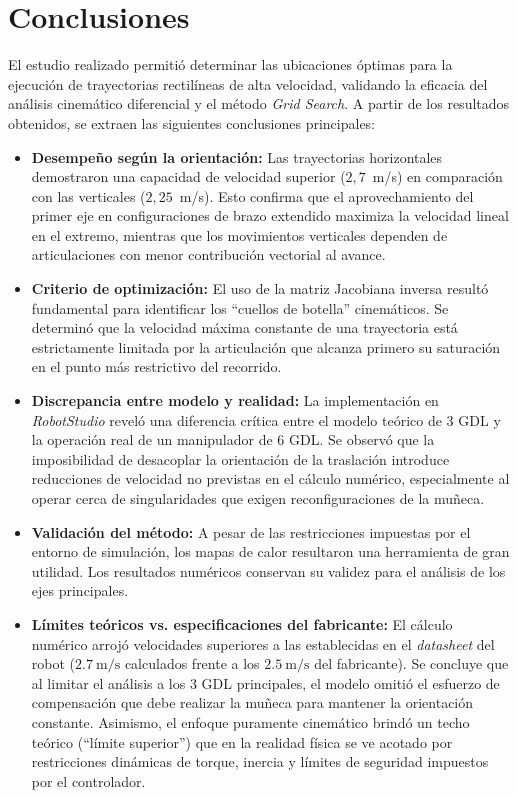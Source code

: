 \section{Conclusiones}

El estudio realizado permitió determinar las ubicaciones óptimas para la ejecución de trayectorias rectilíneas de alta velocidad, validando la eficacia del análisis cinemático diferencial y el método \textit{Grid Search}. A partir de los resultados obtenidos, se extraen las siguientes conclusiones principales:

\begin{itemize}
	\item \textbf{Desempeño según la orientación:} Las trayectorias horizontales demostraron una capacidad de velocidad superior ($2,7$~m/s) en comparación con las verticales ($2,25$~m/s). Esto confirma que el aprovechamiento del primer eje en configuraciones de brazo extendido maximiza la velocidad lineal en el extremo, mientras que los movimientos verticales dependen de articulaciones con menor contribución vectorial al avance.

	\item \textbf{Criterio de optimización:} El uso de la matriz Jacobiana inversa resultó fundamental para identificar los ``cuellos de botella'' cinemáticos. Se determinó que la velocidad máxima constante de una trayectoria está estrictamente limitada por la articulación que alcanza primero su saturación en el punto más restrictivo del recorrido.

	\item \textbf{Discrepancia entre modelo y realidad:} La implementación en \textit{RobotStudio} reveló una diferencia crítica entre el modelo teórico de 3 GDL y la operación real de un manipulador de 6 GDL. Se observó que la imposibilidad de desacoplar la orientación de la traslación introduce reducciones de velocidad no previstas en el cálculo numérico, especialmente al operar cerca de singularidades que exigen reconfiguraciones de la muñeca.

	\item \textbf{Validación del método:} A pesar de las restricciones impuestas por el entorno de simulación, los mapas de calor resultaron una herramienta de gran utilidad. Los resultados numéricos conservan su validez para el análisis de los ejes principales.

	\item \textbf{Límites teóricos vs. especificaciones del fabricante:} El cálculo numérico arrojó velocidades superiores a las establecidas en el \textit{datasheet} del robot ($\qty{2.7}{\meter\per\second}$ calculados frente a los $\qty{2.5}{\meter\per\second}$ del fabricante). Se concluye que al limitar el análisis a los 3 GDL principales, el modelo omitió el esfuerzo de compensación que debe realizar la muñeca para mantener la orientación constante. Asimismo, el enfoque puramente cinemático brindó un techo teórico (``límite superior'') que en la realidad física se ve acotado por restricciones dinámicas de torque, inercia y límites de seguridad impuestos por el controlador.
\end{itemize}
